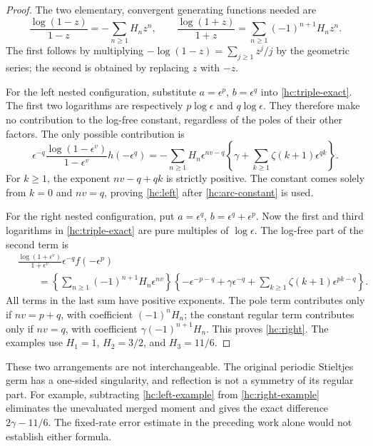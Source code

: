 \begin{proof}
The two elementary, convergent generating functions needed are
\begin{equation}\label{hc:harmonic-generators}
 \frac{\log(1-z)}{1-z}=-\sum_{n\ge1}H_nz^n,
 \qquad
 \frac{\log(1+z)}{1+z}=\sum_{n\ge1}(-1)^{n+1}H_nz^n.
\end{equation}
The first follows by multiplying
$-\log(1-z)=\sum_{j\ge1}z^j/j$ by the geometric series; the second
is obtained by replacing $z$ with $-z$.

For the left nested configuration, substitute
$a=\epsilon^p$, $b=\epsilon^q$ into \eqref{hc:triple-exact}.
The first two logarithms are respectively $p\log\epsilon$ and
$q\log\epsilon$. They therefore make no contribution to the
log-free constant, regardless of the poles of their other factors.
The only possible contribution is
\[
 \epsilon^{-q}\frac{\log(1-\epsilon^v)}{1-\epsilon^v}
                       h(-\epsilon^q)
 =-\sum_{n\ge1}H_n\epsilon^{nv-q}
       \left\{\gamma+\sum_{k\ge1}\zeta(k+1)\epsilon^{qk}\right\}.
\]
For $k\ge1$, the exponent $nv-q+qk$ is strictly positive. The constant
comes solely from $k=0$ and $nv=q$, proving \eqref{hc:left} after
\eqref{hc:arc-constant} is used.

For the right nested configuration, put
$a=\epsilon^q$, $b=\epsilon^q+\epsilon^p$. Now the first and third
logarithms in \eqref{hc:triple-exact} are pure multiples of
$\log\epsilon$. The log-free part of the second term is
\begin{align*}
 &\frac{\log(1+\epsilon^v)}{1+\epsilon^v}
          \epsilon^{-q}f(-\epsilon^p)\\
 &\qquad=\left\{\sum_{n\ge1}(-1)^{n+1}H_n\epsilon^{nv}\right\}
       \left\{-\epsilon^{-p-q}+\gamma\epsilon^{-q}
                +\sum_{k\ge1}\zeta(k+1)\epsilon^{pk-q}\right\}.
\end{align*}
All terms in the last sum have positive exponents. The pole term
contributes only if $nv=p+q$, with coefficient $(-1)^nH_n$; the
constant regular term contributes only if $nv=q$, with coefficient
$\gamma(-1)^{n+1}H_n$. This proves \eqref{hc:right}. The examples use
$H_1=1$, $H_2=3/2$, and $H_3=11/6$.
\end{proof}

These two arrangements are not interchangeable. The original periodic
Stieltjes germ has a one-sided singularity, and reflection is not a
symmetry of its regular part. For example, subtracting
\eqref{hc:left-example} from \eqref{hc:right-example} eliminates the
unevaluated merged moment and gives the exact difference
$2\gamma-11/6$. The fixed-rate error estimate in the preceding work
alone would not establish either formula.

